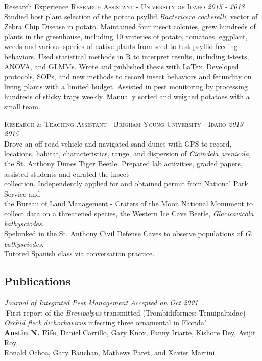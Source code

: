 \documentclass{resume} %
\begin{document}
\begin{rSection}{Research Experience}
\textsc{Research Assistant - University of Idaho} \hfill {\em \textit{2015 - 2018}}\\
Studied host plant selection of the potato psyllid \textit{Bactericera cockerelli}, vector of Zebra Chip Disease in potato. Maintained four insect colonies, grew hundreds of plants in the greenhouse, including 10 varieties of potato, tomatoes, eggplant, weeds and various species of native plants from seed to test psyllid feeding behaviors. Used statistical methods in R to interpret results, including t-tests, ANOVA, and GLMMs. Wrote and published thesis with LaTex. Developed protocols, SOPs, and new methods to record insect behaviors and fecundity on living plants with a limited budget. Assisted in pest monitoring by processing hundreds of sticky traps weekly. Manually sorted and weighed potatoes with a small team.\\ \hfill

\textsc{Research \& Teaching Assistant - Brigham Young University - Idaho} \hfill {\em \textit{2013 - 2015}}\\
Drove an off-road vehicle and navigated sand dunes with GPS to record, locations, habitat, characteristics, range, and dispersion of \textit{Cicindela arenicola}, the St. Anthony Dunes Tiger Beetle. Prepared lab activities, graded papers, assisted students and curated the insect\\
collection. Independently applied for and obtained permit from National Park Service and\\
the Bureau of Land Management - Craters of the Moon National Monument to collect data on a threatened species, the Western Ice Cave Beetle, \textit{Glacicavicola bathysciodes}.\\
Spelunked in the St. Anthony Civil Defense Caves to observe populations of \textit{G. bathysciodes}.\\
Tutored Spanish class via conversation practice.\\ \hfill


\subsection*{Publications}
\textit{Journal of Integrated Pest Management} \hfill {\em \textit{Accepted on Oct 2021}}\\
`First report of the \textit{Brevipalpus}-transmitted (Trombidiformes: Tenuipalpidae)\\
\textit{Orchid fleck dichorhavirus} infecting three ornamental in Florida'\\
\textbf{Austin N. Fife}, Daniel Carrillo, Gary Knox, Fanny Iriarte, Kishore Dey, Avijit Roy,\\
 Ronald Ochoa, Gary Bauchan, Mathews Paret, and Xavier Martini\\ \hfill
 

\end{rSection}
\end{document}
